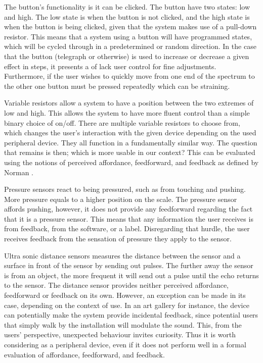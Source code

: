 The button's functionality is it can be clicked. The button have two states: low and high. The low state is when the button is not clicked, and the high state is when the button is being clicked, given that the system makes use of a pull-down resistor. This means that a system using a button will have programmed states, which will be cycled through in a predetermined or random direction. In the case that the button (telegraph or otherwise) is used to increase or decrease a given effect in steps, it presents a of lack user control for fine adjustments. Furthermore, if the user wishes to quickly move from one end of the spectrum to the other one button must be pressed repeatedly which can be straining.

Variable resistors allow a system to have a position between the two extremes of low and high. This allows the system to have more fluent control than a simple binary choice of on/off. There are multiple variable resistors to choose from, which changes the user's interaction with the given device depending on the used peripheral device.  They all function in a fundamentally similar way. The question that remains is then; which is more usable in our context? This can be evaluated using the notions of perceived affordance, feedforward, and feedback as defined by Norman \cite{Norman:1999:ACD:301153.301168}.

Pressure sensors react to being pressured, such as from touching and pushing. More pressure equals to a higher position on the scale. The pressure sensor affords pushing, however, it does not provide any feedforward regarding the fact that it is a pressure sensor. This means that any information the user receives is from feedback, from the software, or a label. Disregarding that hurdle, the user receives feedback from the sensation of pressure they apply to the sensor. 

Ultra sonic distance sensors measures the distance between the sensor and a surface in front of the sensor by sending out pulses. The further away the sensor is from an object, the more frequent it will send out a pulse until the echo returns to the sensor. The distance sensor provides neither perceived affordance, feedforward or feedback on its own. However, an exception can be made in its case, depending on the context of use. In an art gallery for instance, the device can potentially make the system provide incidental feedback, since potential users that simply walk by the installation will modulate the sound. This, from the users' perspective, unexpected behaviour invites curiosity. Thus it is worth considering as a peripheral device, even if it does not perform well in a formal evaluation of affordance, feedforward, and feedback.

